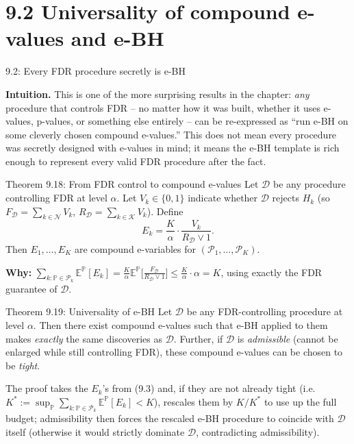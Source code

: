 \documentclass[aspectratio=169,10pt]{beamer}
\newcommand{\Kc}{\mathcal{K}}
\newcommand{\Nc}{\mathcal{N}}
\begin{document}
\section{9.2 Universality of compound e-values and e-BH}

\begin{frame}[allowframebreaks]{9.2: Every FDR procedure secretly is e-BH}

\textbf{Intuition.} This is one of the more surprising results in the chapter: \emph{any} procedure that controls FDR -- no matter how it was built, whether it uses e-values, p-values, or something else entirely -- can be re-expressed as ``run e-BH on some cleverly chosen compound e-values.'' This does not mean every procedure was secretly designed with e-values in mind; it means the e-BH template is rich enough to represent every valid FDR procedure after the fact.

\begin{block}{Theorem 9.18: From FDR control to compound e-values}
Let $\mathcal{D}$ be any procedure controlling FDR at level $\alpha$. Let $V_k \in \{0,1\}$ indicate whether $\mathcal{D}$ rejects $H_k$ (so $F_\mathcal{D}=\sum_{k\in\Nc}V_k$, $R_\mathcal{D}=\sum_{k\in\Kc}V_k$). Define
\[
E_k = \frac{K}{\alpha}\cdot\frac{V_k}{R_\mathcal{D}\vee 1}. \tag{9.3}
\]
Then $E_1,\dots,E_K$ are compound e-variables for $(\mathcal{P}_1,\dots,\mathcal{P}_K)$.
\end{block}

\textbf{Why:} $\sum_{k:\mathbb{P}\in\mathcal{P}_k}\mathbb{E}^{\mathbb{P}}[E_k] = \frac{K}{\alpha}\mathbb{E}^{\mathbb{P}}\big[\frac{F_\mathcal{D}}{R_\mathcal{D}\vee1}\big] \le \frac{K}{\alpha}\cdot\alpha = K$, using exactly the FDR guarantee of $\mathcal{D}$.

\framebreak

\begin{block}{Theorem 9.19: Universality of e-BH}
Let $\mathcal{D}$ be any FDR-controlling procedure at level $\alpha$. Then there exist compound e-values such that e-BH applied to them makes \emph{exactly} the same discoveries as $\mathcal{D}$. Further, if $\mathcal{D}$ is \emph{admissible} (cannot be enlarged while still controlling FDR), these compound e-values can be chosen to be \emph{tight}.
\end{block}
The proof takes the $E_k$'s from (9.3) and, if they are not already tight (i.e. $K^\ast := \sup_{\mathbb{P}}\sum_{k:\mathbb{P}\in\mathcal{P}_k}\mathbb{E}^{\mathbb{P}}[E_k] < K$), rescales them by $K/K^\ast$ to use up the full budget; admissibility then forces the rescaled e-BH procedure to coincide with $\mathcal{D}$ itself (otherwise it would strictly dominate $\mathcal{D}$, contradicting admissibility).


\end{frame}
\end{document}
